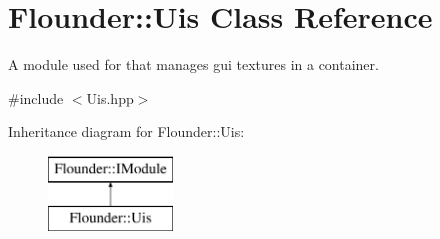 \hypertarget{class_flounder_1_1_uis}{}\section{Flounder\+:\+:Uis Class Reference}
\label{class_flounder_1_1_uis}


A module used for that manages gui textures in a container.  




{\ttfamily \#include $<$Uis.\+hpp$>$}

Inheritance diagram for Flounder\+:\+:Uis\+:\begin{figure}[H]
\begin{center}
\leavevmode
\includegraphics[height=2.000000cm]{class_flounder_1_1_uis}
\end{center}
\end{figure}
